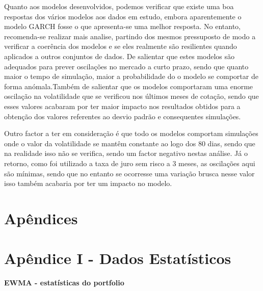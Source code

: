 \documentclass[
  12pt,
  a4paper,
  openany]{book}
\begin{document}
Quanto aos modelos desenvolvidos, podemos verificar que existe uma boa respostas dos vários modelos aos dados em estudo, embora aparentemente o modelo GARCH fosse o que apresenta-se uma melhor resposta. No entanto, recomenda-se realizar mais analise, partindo dos mesmos pressuposto de modo a verificar a coerência dos modelos e se eles realmente são resilientes quando aplicados a outros conjuntos de dados. De salientar que estes modelos são adequados para prever oscilações no mercado a curto prazo, sendo que quanto maior o tempo de simulação, maior a probabilidade do o modelo se comportar de forma anómala.Também de salientar que os modelos comportaram uma enorme oscilação na volatilidade que se verificou nos últimos meses de cotação, sendo que esses valores acabaram por ter maior impacto nos resultados obtidos para a obtenção dos valores referentes ao desvio padrão e consequentes simulações.

Outro factor a ter em consideração é que todo os modelos comportam simulações onde o valor da volatilidade se mantêm constante ao logo dos 80 dias, sendo que na realidade isso não se verifica, sendo um factor negativo nestas análise. Já o retorno, como foi utilizado a taxa de juro sem risco a 3 meses, as oscilações aqui são mínimas, sendo que no entanto se ocorresse uma variação brusca nesse valor isso também acabaria por ter um impacto no modelo.

  

\part*{Apêndices}

\newpage
\part*{\normalfont\huge\bfseries\centering Apêndice I - Dados Estatísticos}
\newpage

\begin{center}
 {\normalfont\Large\bfseries EWMA - estatísticas do portfolio}
\end{center}
\end{document}
